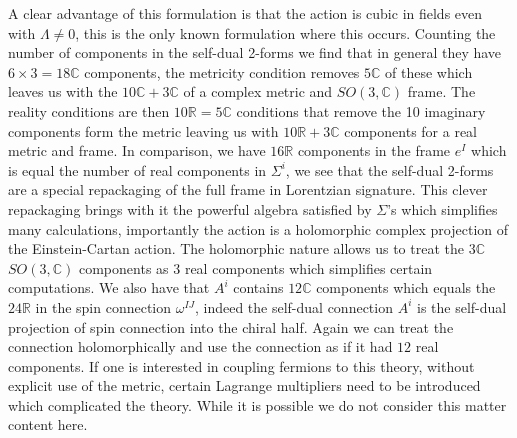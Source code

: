 \documentclass[10pt]{report}
\theoremstyle{definition}
\newcommand{\R}[0]{\mathbb{R}}
\newcommand{\C}[0]{\mathbb{C}}
\begin{document}
A clear advantage of this formulation is that the action is cubic in fields even with $\Lambda \neq 0$, this is the only known formulation where this occurs. Counting the number of components in the self-dual 2-forms we find that in general they have $6 \times 3 = 18\C$ components, the metricity condition removes $5\C$ of these which leaves us with the $10\C + 3\C$ of a complex metric and $SO(3,\C)$ frame. The reality conditions are then $10\R = 5\C$  conditions that remove the 10 imaginary components form the metric leaving us with $10\R + 3\C$ components for a real metric and frame. In comparison, we have $16\R$ components in the frame $e^I$ which is equal the number of real components in $\Sigma^i$, we see that the self-dual 2-forms are a special repackaging of the full frame in Lorentzian signature. This clever repackaging brings with it the powerful algebra satisfied by $\Sigma$'s which simplifies many calculations, importantly the action is a holomorphic complex projection of the Einstein-Cartan action. The holomorphic nature allows us to treat the $3\C$ $SO(3,\C)$ components as $3$ real components which simplifies certain computations. We also have that $A^i$ contains $12\C$ components which equals the $24\R$ in the spin connection $\omega^{IJ}$, indeed the self-dual connection $A^i$ is the self-dual projection of spin connection into the chiral half. Again we can treat the connection holomorphically and use the connection as if it had $12$ real components. If one is interested in coupling fermions to this theory, without explicit use of the metric, certain Lagrange multipliers need to be introduced which complicated the theory. While it is possible we do not consider this matter content here.
\end{document}
